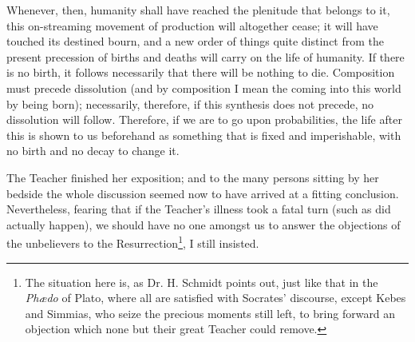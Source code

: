 Whenever, then, humanity shall have reached the plenitude that belongs to it, this on-streaming movement of production will altogether cease; it will have touched its destined bourn, and a new order of things quite distinct from the present precession of births and deaths will carry on the life of humanity. If there is no birth, it follows necessarily that there will be nothing to die. Composition must precede dissolution (and by composition I mean the coming into this world by being born); necessarily, therefore, if this synthesis does not precede, no dissolution will follow. Therefore, if we are to go upon probabilities, the life after this is shown to us beforehand as something that is fixed and imperishable, with no birth and no decay to change it.

The Teacher finished her exposition; and to the many persons sitting by her bedside the whole discussion seemed now to have arrived at a fitting conclusion. Nevertheless, fearing that if the Teacher’s illness took a fatal turn (such as did actually happen), we should have no one amongst us to answer the objections of the unbelievers to the Resurrection\footnote{The situation here is, as Dr. H. Schmidt points out, just like that in the \emph{Phædo} of Plato, where all are satisfied with Socrates’ discourse, except Kebes and Simmias, who seize the precious moments still left, to bring forward an objection which none but their great Teacher could remove.}, I still insisted.

